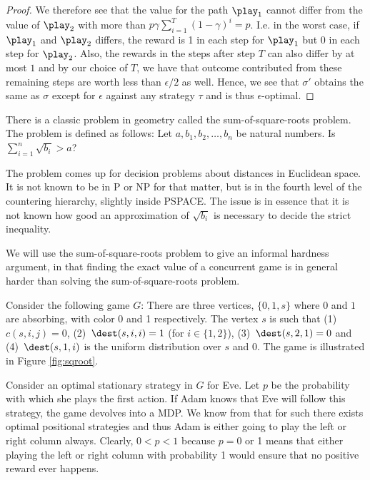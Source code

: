 \begin{proof}
We therefore see that the value for the path $\play_1$ cannot differ from the value of $\play_2$ with more than $p\gamma\sum_{i=1}^T(1-\gamma)^i=p$. I.e. in the worst case, if $\play_1$ and $\play_2$ differs, the reward is 1 in each step for $\play_1$ but 0 in each step for $\play_2$.
Also, the rewards in the steps after step $T$ can also differ by at most $1$ and by our choice of $T$, we have that outcome contributed from these remaining steps are worth less than $\epsilon/2$ as well.
Hence, we see that $\sigma'$ obtains the same as $\sigma$ except for $\epsilon$ against any strategy $\tau$ and is thus $\epsilon$-optimal.













\end{proof}

There is a classic problem in geometry called the sum-of-square-roots problem. The problem is defined as follows:
Let $a,b_1,b_2,\dots,b_n$ be natural numbers. Is $\sum_{i=1}^n\sqrt{b_i}>a$? 

The problem comes up for decision problems about distances in Euclidean space. It is not known to be in P or NP for that matter, but is in the fourth level of the countering hierarchy, slightly inside PSPACE. The issue is in essence that it is not known how good an approximation of $\sqrt{b_i}$ is necessary to decide the strict inequality. 

We will use the sum-of-square-roots problem to give an informal hardness argument, in that finding the exact value of a concurrent game is in general harder than solving the sum-of-square-roots problem. 

Consider the following game $G$:
There are three vertices, $\{0,1,s\}$ where $0$ and $1$ are absorbing, with color 0 and 1 respectively.
The vertex $s$ is such that (1)~$c(s,i,j)=0$, (2)~$\dest(s,i,i)=1$ (for $i\in \{1,2\}$), (3)~$\dest(s,2,1)=0$ and (4)~$\dest(s,1,i)$ is the uniform distribution over $s$ and $0$. The game is illustrated in Figure \ref{fig:sqroot}.

Consider an optimal stationary strategy in $G$ for Eve. Let $p$ be the probability with which she plays the first action. If Adam knows that Eve will follow this strategy, the game devolves into a MDP. We know from that for such there exists optimal positional strategies and thus Adam is either going to play the left or right column always. Clearly, $0<p<1$ because $p=0$ or 1 means that either playing the left or right column with probability 1 would ensure that no positive reward ever happens.


